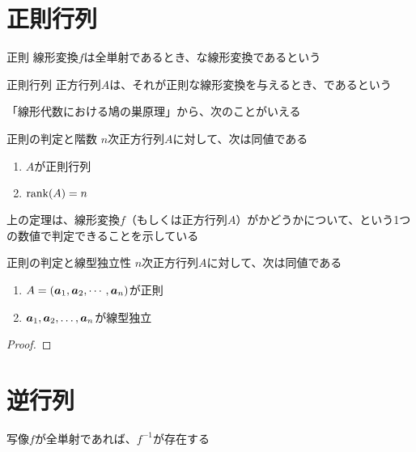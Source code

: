 \documentclass[../../../topic_linear-algebra]{subfiles}
\begin{document}
\sectionline
\section{正則行列}

\begin{definition}{正則}
  線形変換$f$は全単射であるとき、な線形変換であるという
\end{definition}

\begin{definition}{正則行列}
  正方行列$A$は、それが正則な線形変換を与えるとき、であるという
\end{definition}

「線形代数における鳩の巣原理」から、次のことがいえる

\begin{theorem}{正則の判定と階数}
  $n$次正方行列$A$に対して、次は同値である
  \begin{enumerate}[label=\romanlabel]
    \item $A$が正則行列
    \item $\rank(A) = n$
  \end{enumerate}
\end{theorem}

上の定理は、線形変換$f$（もしくは正方行列$A$）がかどうかについて、という1つの数値で判定できることを示している

\sectionline

\begin{theorem}{正則の判定と線型独立性}
  $n$次正方行列$A$に対して、次は同値である
  \begin{enumerate}[label=\romanlabel]
    \item $A = (\vb*{a}_1 , \vb*{a}_2 , \cdots , \vb*{a}_n)$が正則
    \item $\vb*{a}_1, \vb*{a}_2, \dots, \vb*{a}_n$が線型独立
  \end{enumerate}
\end{theorem}

\begin{proof}
\end{proof}

\sectionline
\section{逆行列}

写像$f$が全単射であれば、$f^{-1}$が存在する
\end{document}
